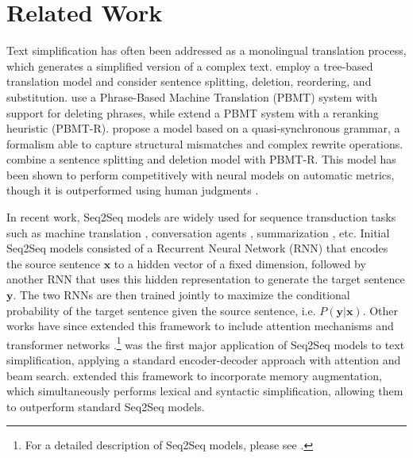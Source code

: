 \documentclass[11pt,a4paper]{article}
\begin{document}
\section{Related Work}

Text simplification has often been addressed as a monolingual translation process, which generates a simplified version of a complex text.  employ a tree-based translation model and consider sentence splitting, deletion, reordering, and substitution.  use a Phrase-Based Machine Translation (PBMT) system with support for deleting phrases, while   extend a PBMT system with a reranking heuristic (PBMT-R).  propose a model based on a quasi-synchronous grammar, a formalism able to capture structural mismatches and complex rewrite operations.  combine a sentence splitting and deletion model with PBMT-R. This model has been shown to perform competitively with neural models on automatic metrics, though it is outperformed using human judgments \cite{zhang2017sentence}.

In recent work, Seq2Seq models are widely used for sequence transduction tasks such as machine translation \cite{sutskever2014sequence,luong2015effective}, conversation agents \cite{vinyals2015neural}, summarization \cite{nallapati2016abstractive}, etc. Initial Seq2Seq models consisted of a Recurrent Neural Network (RNN) that encodes the source sentence $\textbf{x}$ 
to a hidden vector of a fixed dimension, followed by another RNN that uses this hidden representation to generate the target sentence $\textbf{y}$. The two RNNs are then trained jointly to maximize the conditional probability of the target sentence given the source sentence, i.e. $P(\textbf{y}|\textbf{x})$. Other works have since extended this framework to include attention mechanisms \cite{luong2015effective} and transformer networks \cite{vaswani2017attention}.\footnote{For a detailed description of Seq2Seq models, please see \cite{sutskever2014sequence}.} 
was the first major application of Seq2Seq models to text simplification, applying a standard encoder-decoder approach with attention and beam search.
 extended this framework to incorporate memory augmentation, which simultaneously performs lexical and syntactic simplification, allowing them to outperform standard Seq2Seq models.
\end{document}
